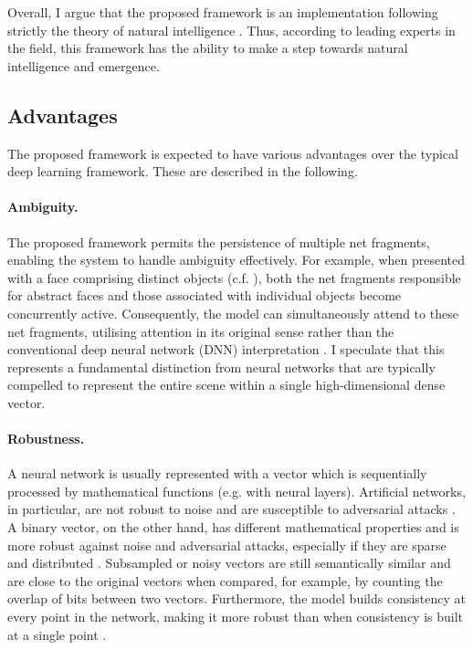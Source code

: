 Overall, I argue that the proposed framework is an implementation following strictly the theory of natural intelligence . Thus, according to leading experts in the field, this framework has the ability to make a step towards natural intelligence and emergence. 

\subsection{Advantages}
The proposed framework is expected to have various advantages over the typical deep learning framework. These are described in the following.

\paragraph{Ambiguity.} The proposed framework permits the persistence of multiple net fragments, enabling the system to handle ambiguity effectively. For example, when presented with a face comprising distinct objects (c.f. ), both the net fragments responsible for abstract faces and those associated with individual objects become concurrently active. Consequently, the model can simultaneously attend to these net fragments, utilising attention in its original sense rather than the conventional deep neural network (DNN) interpretation . I speculate that this represents a fundamental distinction from neural networks that are typically compelled to represent the entire scene within a single high-dimensional dense vector.

\paragraph{Robustness.} A neural network is usually represented with a vector which is sequentially processed by mathematical functions (e.g. with neural layers). Artificial networks, in particular, are not robust to noise and are susceptible to adversarial attacks . A binary vector, on the other hand, has different mathematical properties and is more robust against noise and adversarial attacks, especially if they are sparse and distributed .
Subsampled or noisy vectors are still semantically similar and are close to the original vectors when compared, for example, by counting the overlap of bits between two vectors.
Furthermore, the model builds consistency at every point in the network, making it more robust than when consistency is built at a single point .

